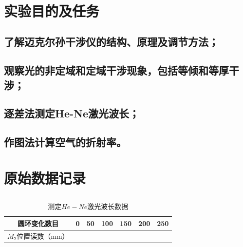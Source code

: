 \documentclass{ctexart}
\begin{document}
~\\
~\\
~\\
~\\
~\\
~\\

\section{实验目的及任务}
\subsection{了解迈克尔孙干涉仪的结构、原理及调节方法；}
\subsection{观察光的非定域和定域干涉现象，包括等倾和等厚干涉；}
\subsection{逐差法测定He-Ne激光波长；}
\subsection{作图法计算空气的折射率。}


\newpage
\section{原始数据记录}
\subsection{}
\begin{table}[!htbp]
    \renewcommand{\arraystretch}{1.2} %
    \centering
    \caption{测定$He-Ne$激光波长数据}
    \label{tab:HeNe}
    \begin{tabular}{|c|m{1.2cm}<{\centering}|m{1.2cm}<{\centering}|m{1.2cm}<{\centering}|m{1.2cm}<{\centering}|m{1.2cm}<{\centering}|m{1.2cm}<{\centering}|}
    \hline
    圆环变化数目 & 0 & 50 & 100 & 150 & 200 & 250 \\
    \hline
    $M_2$位置读数（mm） & & & & & &  \\
    \hline
    \end{tabular}
\end{table}

\subsection{}
\end{document}
